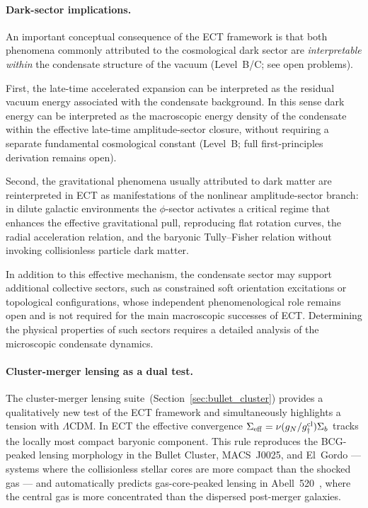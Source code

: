 \documentclass[11pt,a4paper]{article}
\numberwithin{equation}{section}
\begin{document}
\paragraph{Dark-sector implications.}

An important conceptual consequence of the ECT framework is that both
phenomena commonly attributed to the cosmological dark sector are
\emph{interpretable within} the condensate structure of the vacuum
(Level~B/C; see open problems).

First, the late-time accelerated expansion can be interpreted as the
residual vacuum energy associated with the condensate background. In
this sense dark energy can be interpreted as the macroscopic energy density
of the condensate within the effective late-time amplitude-sector closure,
without requiring a separate fundamental cosmological constant
(Level~B; full first-principles derivation remains open).

Second, the gravitational phenomena usually attributed to dark matter
are reinterpreted in ECT as manifestations of the nonlinear
amplitude-sector branch: in dilute galactic environments the
$\phi$-sector activates a critical regime that enhances the effective
gravitational pull, reproducing flat rotation curves, the radial
acceleration relation, and the baryonic Tully--Fisher relation without
invoking collisionless particle dark matter.

In addition to this effective mechanism, the condensate sector may
support additional collective sectors, such as constrained soft
orientation excitations or topological configurations, whose
independent phenomenological role remains open and is not required
for the main macroscopic successes of ECT.
Determining the physical properties of such sectors requires a
detailed analysis of the microscopic condensate dynamics.


\paragraph{Cluster-merger lensing as a dual test.}

The cluster-merger lensing suite~(Section~\ref{sec:bullet_cluster})
provides a qualitatively new test of the ECT framework and simultaneously
highlights a tension with $\Lambda$CDM.
In ECT the effective convergence $\Sigma_{\rm eff}=\nu(g_N/g_\dagger^{\rm cl})\Sigma_b$
tracks the locally most compact baryonic component.
This rule reproduces the BCG-peaked lensing morphology in the Bullet Cluster,
MACS~J0025, and El~Gordo --- systems where the collisionless stellar cores
are more compact than the shocked gas --- and automatically predicts
gas-core-peaked lensing in Abell~520~\cite{Mahdavi2007,Jee2012}, where the
central gas is more concentrated than the dispersed post-merger galaxies.
\end{document}
